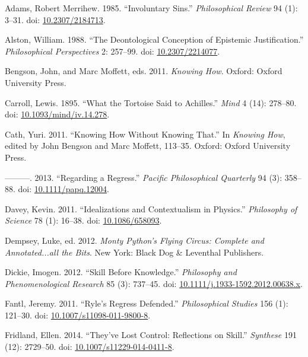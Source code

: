 \documentclass[
  11pt,
  letterpaper,
  DIV=11,
  numbers=noendperiod,
  twoside]{scrartcl}
\newlength{\cslhangindent}
\newenvironment{CSLReferences}[2] %
 {\begin{list}{}{%
  \setlength{\itemindent}{0pt}
  \setlength{\leftmargin}{0pt}
  \setlength{\parsep}{0pt}
  \ifodd #1
   \setlength{\leftmargin}{\cslhangindent}
   \setlength{\itemindent}{-1\cslhangindent}
  \fi
  \setlength{\itemsep}{#2\baselineskip}}}
 {\end{list}}
\begin{document}
\label{refs}
\begin{CSLReferences}{1}{0}
Adams, Robert Merrihew. 1985. {``Involuntary Sins.''}
\emph{Philosophical Review} 94 (1): 3--31. doi:
\href{https://doi.org/10.2307/2184713}{10.2307/2184713}.

Alston, William. 1988. {``The Deontological Conception of Epistemic
Justification.''} \emph{Philosophical Perspectives} 2: 257--99. doi:
\href{https://doi.org/10.2307/2214077}{10.2307/2214077}.

Bengson, John, and Marc Moffett, eds. 2011. \emph{Knowing How}. Oxford:
Oxford University Press.

Carroll, Lewis. 1895. {``What the Tortoise Said to Achilles.''}
\emph{Mind} 4 (14): 278--80. doi:
\href{https://doi.org/10.1093/mind/iv.14.278}{10.1093/mind/iv.14.278}.

Cath, Yuri. 2011. {``Knowing How Without Knowing That.''} In
\emph{Knowing How}, edited by John Bengson and Marc Moffett, 113--35.
Oxford: Oxford University Press.

---------. 2013. {``Regarding a Regress.''} \emph{Pacific Philosophical
Quarterly} 94 (3): 358--88. doi:
\href{https://doi.org/10.1111/papq.12004}{10.1111/papq.12004}.

Davey, Kevin. 2011. {``Idealizations and Contextualism in Physics.''}
\emph{Philosophy of Science} 78 (1): 16--38. doi:
\href{https://doi.org/10.1086/658093}{10.1086/658093}.

Dempsey, Luke, ed. 2012. \emph{Monty Python's Flying Circus: Complete
and Annotated...all the Bits}. New York: Black Dog \& Leventhal
Publishers.

Dickie, Imogen. 2012. {``Skill Before Knowledge.''} \emph{Philosophy and
Phenomenological Research} 85 (3): 737--45. doi:
\href{https://doi.org/10.1111/j.1933-1592.2012.00638.x}{10.1111/j.1933-1592.2012.00638.x}.

Fantl, Jeremy. 2011. {``Ryle's Regress Defended.''} \emph{Philosophical
Studies} 156 (1): 121--30. doi:
\href{https://doi.org/10.1007/s11098-011-9800-8}{10.1007/s11098-011-9800-8}.

Fridland, Ellen. 2014. {``They've Lost Control: Reflections on Skill.''}
\emph{Synthese} 191 (12): 2729--50. doi:
\href{https://doi.org/10.1007/s11229-014-0411-8}{10.1007/s11229-014-0411-8}.


\end{CSLReferences}
\end{document}
